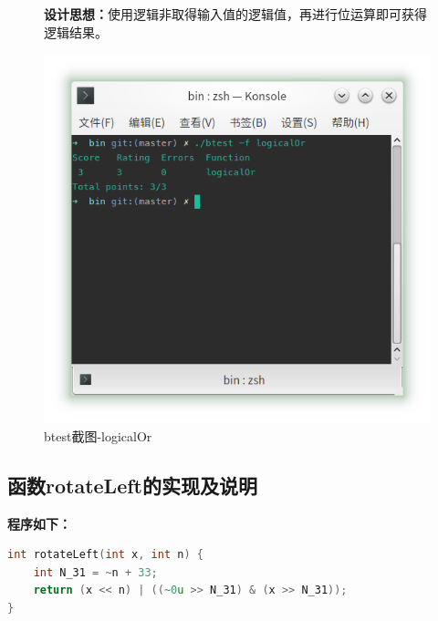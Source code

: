 \begin{figure}[H]
\begin{minipage}[c]{0.5\linewidth}
\textbf{设计思想：}使用逻辑非取得输入值的逻辑值，再进行位运算即可获得逻辑结果。
		
\end{minipage}
\begin{minipage}[c]{0.4\linewidth}
\centering
\includegraphics[width=0.9\linewidth]{figures/logicalOr}
\caption{btest截图-logicalOr}
\label{fig:logicalOr}
\end{minipage}
\end{figure}

\subsection{函数rotateLeft的实现及说明}
\textbf{程序如下：}
	
\begin{lstlisting}[language = c]
int rotateLeft(int x, int n) {
    int N_31 = ~n + 33;
	return (x << n) | ((~0u >> N_31) & (x >> N_31));
}
\end{lstlisting}
	
